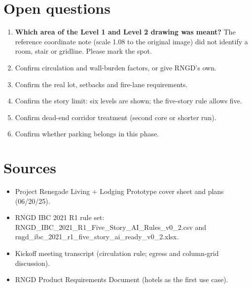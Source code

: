 \documentclass[10pt]{article}
\begin{document}
\section{Open questions}
\begin{enumerate}
\item \textbf{Which area of the Level 1 and Level 2 drawing was meant?} The reference coordinate note (scale 1.08 to the
original image) did not identify a room, stair or gridline. Please mark the spot.
\item Confirm circulation and wall-burden factors, or give RNGD's own.
\item Confirm the real lot, setbacks and fire-lane requirements.
\item Confirm the story limit: six levels are shown; the five-story rule allows five.
\item Confirm dead-end corridor treatment (second core or shorter run).
\item Confirm whether parking belongs in this phase.
\end{enumerate}

\section{Sources}
\begin{itemize}
\item Project Renegade Living + Lodging Prototype cover sheet and plans (06/20/25).
\item RNGD IBC 2021 R1 rule set: RNGD\_IBC\_2021\_R1\_Five\_Story\_AI\_Rules\_v0\_2.csv and rngd\_ibc\_2021\_r1\_five\_story\_ai\_ready\_v0\_2.xlsx.
\item Kickoff meeting transcript (circulation rule; egress and column-grid discussion).
\item RNGD Product Requirements Document (hotels as the first use case).
\end{itemize}
\end{document}
